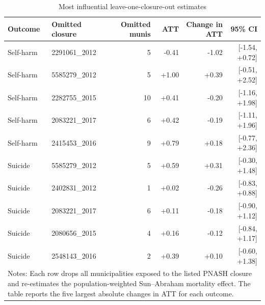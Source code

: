 \begin{table}[!htbp]\centering
\caption{Most influential leave-one-closure-out estimates}
\label{tab:closure-influence}
\small
\begin{tabular}{llrrrr}
\toprule
Outcome & Omitted closure & Omitted munis & ATT & Change in ATT & 95\% CI \\
\midrule
Self-harm & 2291061\_2012 & 5 & -0.41 & -1.02 & [-1.54, +0.72] \\
Self-harm & 5585279\_2012 & 5 & +1.00 & +0.39 & [-0.51, +2.52] \\
Self-harm & 2282755\_2015 & 10 & +0.41 & -0.20 & [-1.16, +1.98] \\
Self-harm & 2083221\_2017 & 6 & +0.42 & -0.19 & [-1.11, +1.96] \\
Self-harm & 2415453\_2016 & 9 & +0.79 & +0.18 & [-0.77, +2.36] \\
Suicide & 5585279\_2012 & 5 & +0.59 & +0.31 & [-0.30, +1.48] \\
Suicide & 2402831\_2012 & 1 & +0.02 & -0.26 & [-0.83, +0.88] \\
Suicide & 2083221\_2017 & 6 & +0.11 & -0.18 & [-0.90, +1.12] \\
Suicide & 2080656\_2015 & 4 & +0.16 & -0.12 & [-0.84, +1.17] \\
Suicide & 2548143\_2016 & 2 & +0.39 & +0.10 & [-0.60, +1.38] \\
\bottomrule
\multicolumn{6}{p{0.88\textwidth}}{\footnotesize Notes: Each row drops all municipalities exposed to the listed PNASH closure and re-estimates the population-weighted Sun--Abraham mortality effect. The table reports the five largest absolute changes in ATT for each outcome.}\\
\end{tabular}
\end{table}
